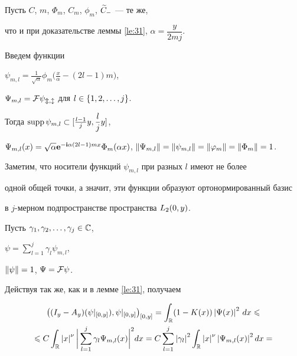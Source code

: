 \begin{pf}


Пусть $C$, $m$, $\Phi_{m}$, $C_{m}$, $\phi_{m}$, $\widetilde{C}_{-}$ --- те же, 


что и при доказательстве леммы \ref{le:31}, $\alpha=\dfrac{y}{2 m j}$.


Введем функции


$\psi_{m,l}=\frac{1}{\sqrt{\alpha}}\phi_{m} \big(\frac{x}{\alpha}


-(2l-1)m \big)$,


$\Psi_{m,l}=\cal F\psi_{m,l}$ для $l\in\left\{1,2,\dotsc,j\right\}$.


Тогда $\operatorname{supp}\psi_{m,l}\subset [\frac{l-1}{j}y,\dfrac{l}{j}y ]$,


$\Psi_{m,l}(x)=\sqrt{\alpha}\bold e^{-\bold i


\alpha (2l-1)m x}\Phi_{m}(\alpha x)$, $\norm{\Psi_{m,l}}=


\norm{\psi_{m,l}}=\norm{\phi_{m}}=\norm{\Phi_{m}}=1$.


Заметим, что носители функций $\psi_{m,l}$ при разных $l$ имеют не более 


одной общей точки, а значит, эти функции образуют ортонормированный базис


в $j$-мерном подпространстве пространства $L_{2}(0,y)$.





Пусть $\gamma_{1},\gamma_{2},\dotsc,\gamma_{j}\in\Bbb C$,


$\psi=\sum\limits_{l=1}^{j}\gamma_{l}\psi_{m,l}$,


$\left\|\psi\right\|=1$, $\Psi=\cal F\psi$.


Действуя так же, как и в лемме \ref{le:31}, получаем


\begin{multline*}


\big((I_{y}-A_{y}) (\psi|_{[0,y]}),


\psi|_{[0,y]} \big)_{[0,y]}=


\int_{\Bbb R} (1-K(x))\abs{\Psi(x)}^{2}\,dx\leqslant\\


%


\leqslant C\int_{\Bbb R}\abs{x}^{\nu}


\bigg|\sum_{l=1}^{j}\gamma_{l}\Psi_{m,l}(x)\bigg|^{2}dx=


C\sum_{l=1}^{j}\abs{\gamma_{l}}^{2} \int_{\Bbb R}\abs{x}^{\nu}


\abs{\Psi_{m,l}(x)}^{2}dx=\\



\end{multline*}
\end{pf}
